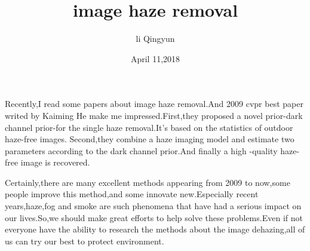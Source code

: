 \documentclass{article}
\author{li Qingyun}
\date{April 11,2018}
\title{image haze removal}
\begin{document}
\maketitle
\par Recently,I read some papers about image haze removal.And 2009 cvpr best paper writed by Kaiming He make me impressed.First,they proposed a novel prior-dark channel prior-for the single haze removal.It's based on the statistics of outdoor haze-free images. Second,they combine a haze imaging model and estimate two parameters according to the dark channel prior.And finally a high -quality haze-free image is recovered.
\par Certainly,there are many excellent methods appearing from 2009 to now,some people improve this method,and some innovate new.Especially recent years,haze,fog and smoke are such phenomena that have had a serious impact on our lives.So,we should make great efforts to help solve these problems.Even if not everyone have the ability to research the methods about the image dehazing,all of us can try our best to protect environment.
\end{document}

